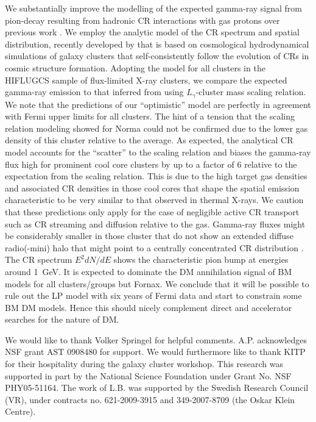 \documentclass[10pt,aps,pra,reprint,amsmath,amsfonts,amssymb,showpacs,nofootinbib,floatfix]{revtex4-1}
\begin{document}
We substantially improve the modelling of the expected gamma-ray
signal from pion-decay resulting from hadronic CR interactions with
gas protons over previous work \citep{2010ApJ...717L..71A}. We employ
the analytic model of the CR spectrum and spatial distribution,
recently developed by \citet{2010MNRAS.409..449P} that is based on
cosmological hydrodynamical simulations of galaxy clusters that self-consistently follow
the evolution of CRs in cosmic structure formation. Adopting the model
for all clusters in the HIFLUGCS sample of flux-limited X-ray
clusters, we compare the expected gamma-ray emission to that inferred
from using $L_\gamma$-cluster mass scaling relation. We note that the
predictions of our ``optimistic'' model are perfectly in agreement
with Fermi upper limits for all clusters.  The hint of a tension that
the scaling relation modeling showed for Norma
\citep{2010ApJ...717L..71A} could not be confirmed due to the
 lower gas density of this cluster relative to the average.
As expected, the analytical CR model accounts for the ``scatter'' to the scaling
relation and biases the gamma-ray flux high for prominent cool core
clusters by up to a factor of 6 relative to the expectation from the
scaling relation. This is due to the high target gas densities and
associated CR densities in those cool cores that shape the spatial
emission characteristic to be very similar to that observed in thermal
X-rays. We caution that these predictions only apply for the case of
negligible active CR transport such as CR streaming and diffusion
relative to the gas. Gamma-ray fluxes might be considerably smaller in those
cluster that do not show an extended diffuse radio(-mini) halo that
might point to a centrally concentrated CR distribution
\citep{2011A&A...527A..99E}. The CR spectrum $E^2 dN/dE$ shows the
characteristic pion bump at energies around 1~GeV. It is expected to
dominate the DM annihilation signal of BM models for all
clusters/groups but Fornax. We conclude that it will be possible to
rule out the LP model with six years of Fermi data and start to
constrain some BM DM models. Hence this should nicely complement
direct and accelerator searches for the nature of DM.






\smallskip We would like to thank Volker Springel for helpful
comments.  A.P. acknowledges NSF grant AST 0908480 for support. We
would furthermore like to thank KITP for their hospitality during the
galaxy cluster workshop.  This research was supported in part by the
National Science Foundation under Grant No. NSF PHY05-51164. The work
of L.B. was supported by the Swedish Research Council (VR), under
contracts no. 621-2009-3915 and 349-2007-8709 (the Oskar Klein
Centre).
\end{document}
